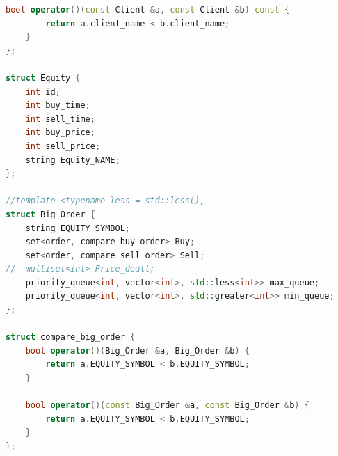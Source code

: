 \documentclass{article}
\begin{document}
\begin{lstlisting}[language=C++]
    bool operator()(const Client &a, const Client &b) const {
        return a.client_name < b.client_name;
    }
};

struct Equity {
    int id;
    int buy_time;
    int sell_time;
    int buy_price;
    int sell_price;
    string Equity_NAME;
};

//template <typename less = std::less(),
struct Big_Order {
    string EQUITY_SYMBOL;
    set<order, compare_buy_order> Buy;
    set<order, compare_sell_order> Sell;
//  multiset<int> Price_dealt;
    priority_queue<int, vector<int>, std::less<int>> max_queue;
    priority_queue<int, vector<int>, std::greater<int>> min_queue;
};

struct compare_big_order {
    bool operator()(Big_Order &a, Big_Order &b) {
        return a.EQUITY_SYMBOL < b.EQUITY_SYMBOL;
    }

    bool operator()(const Big_Order &a, const Big_Order &b) {
        return a.EQUITY_SYMBOL < b.EQUITY_SYMBOL;
    }
};



\end{lstlisting}
\end{document}
